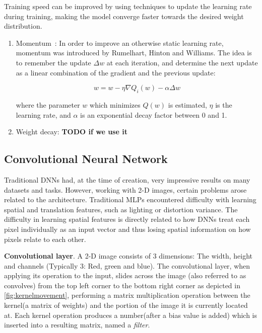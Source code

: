 \documentclass[english, bibtex]{kththesis}
\begin{document}
Training speed can be improved by using techniques to update the learning rate during training, making the model converge faster towards the desired weight distribution.
\begin{enumerate}
\item Momentum~\cite{Rumelhart1986}: In order to improve an otherwise static learning rate, momentum was introduced by Rumelhart, Hinton and Williams. The idea is to remember the update $\Delta w$ at each iteration, and determine the next update as a linear combination of the gradient and the previous update: 

\begin{equation}
    w = w - \eta \nabla Q_i(w)- \alpha \Delta w
    \label{eqn:momentum}
\end{equation}

where the parameter $w$ which minimizes $Q(w)$ is estimated, $\eta$ is the learning rate, and $\alpha$ is an exponential decay factor between 0 and 1.

\item Weight decay: \textbf{TODO if we use it}
\end{enumerate}


\subsection{Convolutional Neural Network}

Traditional DNNs had, at the time of creation, very impressive results on many datasets and tasks. However, working with 2-D images, certain problems arose related to the architecture. Traditional MLPs encountered difficulty with learning spatial and translation features, such as lighting or distortion variance. The difficulty in learning spatial features is directly related to how DNNs treat each pixel individually as an input vector and thus losing spatial information on how pixels relate to each other.

\textbf{Convolutional layer}. A 2-D image consists of 3 dimensions: The width, height and channels (Typically 3: Red, green and blue). The convolutional layer, when applying its operation to the input, slides across the image (also referred to as convolves) from the top left corner to the bottom right corner as depicted in \autoref{fig:kernelmovement}, performing a matrix multiplication operation between the kernel(a matrix of weights) and the portion of the image it is currently located at. Each kernel operation produces a number(after a bias value is added) which is inserted into a resulting matrix, named a \textit{filter}.
\end{document}
